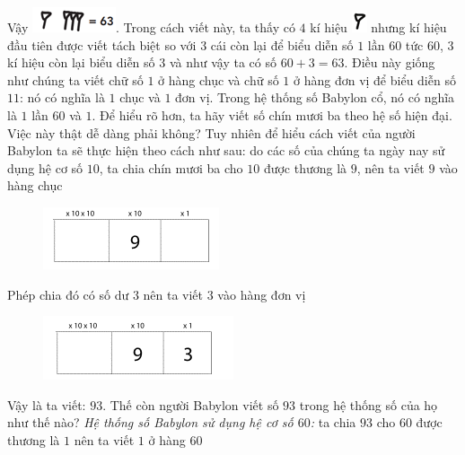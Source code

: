 	\vskip 0.1cm
	Vậy \includegraphics[scale=0.85]{16.1}. Trong cách viết này, ta thấy có $4$ kí hiệu \includegraphics[scale=0.85]{15}   nhưng kí hiệu đầu tiên được viết tách biệt so với $3$ cái còn lại để biểu diễn số $1$ lần $60$ tức $60$, $3$ kí hiệu còn lại biểu diễn số $3$ và như vậy ta có số $60+3 =63$.
	\vskip 0.1cm
	Điều này giống như chúng ta viết chữ số $1$ ở hàng chục và chữ số $1$ ở hàng đơn vị để biểu diễn số $11$: nó có nghĩa là $1$ chục và $1$ đơn vị. Trong  hệ thống số  Babylon cổ, nó có nghĩa là $1$ lần $60$  và $1$.
	\vskip 0.1cm
	Để hiểu rõ hơn, ta hãy viết số chín mươi ba theo hệ số hiện đại. Việc này thật dễ dàng phải không? Tuy nhiên để hiểu cách viết của người Babylon ta sẽ thực hiện theo cách như sau: do các số của chúng ta ngày nay sử dụng hệ cơ số $10$, ta chia chín mươi ba cho $10$ được thương là $9$, nên ta viết $9$ vào hàng chục
	\begin{figure}[H]
		\centering
		\vspace*{-5pt}
		\captionsetup{labelformat= empty, justification=centering}
		\includegraphics[width=0.4\linewidth]{19}
		\vspace*{-10pt}
	\end{figure}
	Phép chia đó có số dư $3$ nên ta viết $3$ vào hàng đơn vị
	\begin{figure}[H]
		\centering
		\vspace*{-5pt}
		\captionsetup{labelformat= empty, justification=centering}
		\includegraphics[width=0.4\linewidth]{20}
		\vspace*{-10pt}
	\end{figure}
	Vậy là ta viết: $93$.
	\vskip 0.1cm
	Thế còn người Babylon viết số $93$ trong hệ thống số của họ như thế nào?
	\vskip 0.1cm
	\textit{Hệ thống số Babylon sử dụng hệ cơ số $60$:} ta chia $93$ cho $60$ được thương là $1$ nên ta viết $1$ ở hàng $60$
